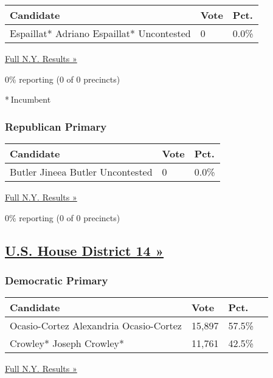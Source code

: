 \begin{longtable}[]{@{}lll@{}}
\toprule
Candidate & Vote & Pct.\tabularnewline
\midrule
\endhead
 Espaillat* Adriano Espaillat* Uncontested & 0 & 0.0\%\tabularnewline
\bottomrule
\end{longtable}

\href{https://www.nytimes3xbfgragh.onion/elections/results/new-york}{Full
N.Y. Results »}

0\% reporting (0 of 0 precincts)

* Incumbent

\hypertarget{republican-primary-9}{%
\subsubsection{Republican Primary}\label{republican-primary-9}}

\begin{longtable}[]{@{}lll@{}}
\toprule
Candidate & Vote & Pct.\tabularnewline
\midrule
\endhead
 Butler Jineea Butler Uncontested & 0 & 0.0\%\tabularnewline
\bottomrule
\end{longtable}

\href{https://www.nytimes3xbfgragh.onion/elections/results/new-york}{Full
N.Y. Results »}

0\% reporting (0 of 0 precincts)

\hypertarget{us-house-district-14-}{%
\subsection{\texorpdfstring{\href{https://www.nytimes3xbfgragh.onion/elections/results/new-york-house-district-14-primary-election}{U.S.
House District 14
»}}{U.S. House District 14 »}}\label{us-house-district-14-}}

\hypertarget{democratic-primary-14}{%
\subsubsection{Democratic Primary}\label{democratic-primary-14}}

\begin{longtable}[]{@{}llll@{}}
\toprule
Candidate & Vote & Pct. &\tabularnewline
\midrule
\endhead
 Ocasio-Cortez Alexandria Ocasio-Cortez & 15,897 & 57.5\%
&\tabularnewline
 Crowley* Joseph Crowley* & 11,761 & 42.5\% &\tabularnewline
\bottomrule
\end{longtable}

\href{https://www.nytimes3xbfgragh.onion/elections/results/new-york}{Full
N.Y. Results »}


